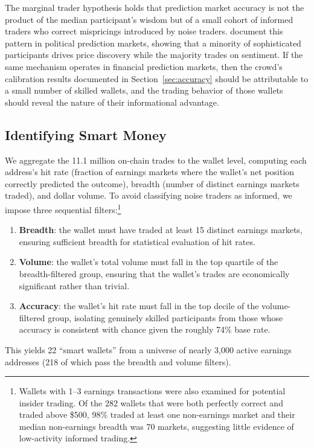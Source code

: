 \documentclass[11pt]{article}
\begin{document}
The marginal trader hypothesis holds that prediction market accuracy is not the product of the median participant's wisdom but of a small cohort of informed traders who correct mispricings introduced by noise traders. \citet{rothschild2016trading} document this pattern in political prediction markets, showing that a minority of sophisticated participants drives price discovery while the majority trades on sentiment. If the same mechanism operates in financial prediction markets, then the crowd's calibration results documented in Section~\ref{sec:accuracy} should be attributable to a small number of skilled wallets, and the trading behavior of those wallets should reveal the nature of their informational advantage.

\subsection{Identifying Smart Money}

We aggregate the 11.1 million on-chain trades to the wallet level, computing each address's hit rate (fraction of earnings markets where the wallet's net position correctly predicted the outcome), breadth (number of distinct earnings markets traded), and dollar volume. To avoid classifying noise traders as informed, we impose three sequential filters:\footnote{Wallets with 1--3 earnings transactions were also examined for potential insider trading. Of the 282 wallets that were both perfectly correct and traded above \$500, 98\% traded at least one non-earnings market and their median non-earnings breadth was 70 markets, suggesting little evidence of low-activity informed trading.}
\begin{enumerate}
\item \textbf{Breadth}: the wallet must have traded at least 15 distinct earnings markets, ensuring sufficient breadth for statistical evaluation of hit rates.
\item \textbf{Volume}: the wallet's total volume must fall in the top quartile of the breadth-filtered group, ensuring that the wallet's trades are economically significant rather than trivial.
\item \textbf{Accuracy}: the wallet's hit rate must fall in the top decile of the volume-filtered group, isolating genuinely skilled participants from those whose accuracy is consistent with chance given the roughly 74\% base rate.
\end{enumerate}

This yields 22 ``smart wallets'' from a universe of nearly 3,000 active earnings addresses (218 of which pass the breadth and volume filters).
\end{document}
